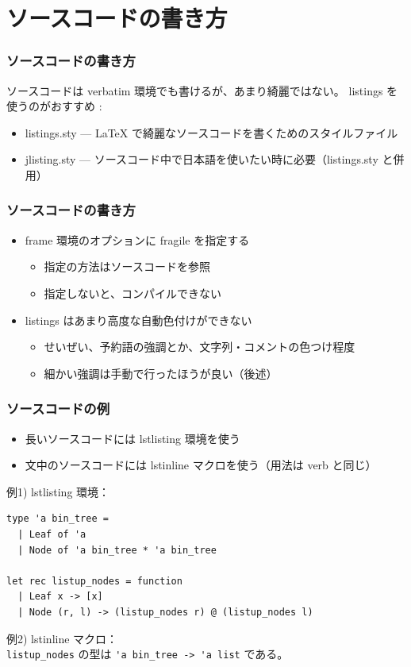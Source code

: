 \documentclass[dvipdfmx,cjk,xcolor=dvipsnames,envcountsect,notheorems,12pt]{beamer}
\theoremstyle{definition}
\begin{document}
\section{ソースコードの書き方}

\begin{frame}
  \frametitle{ソースコードの書き方}
  ソースコードは verbatim 環境でも書けるが、あまり綺麗ではない。
  \vfill
  listings を使うのがおすすめ :
  \begin{itemize}
  \item listings.sty --- LaTeX で綺麗なソースコードを書くためのスタイルファイル
  \item jlisting.sty --- ソースコード中で日本語を使いたい時に必要（listings.sty と併用）
  \end{itemize}
\end{frame}

\begin{frame}
  \renewcommand{\baselinestretch}{1.3}%
  \frametitle{ソースコードの書き方}
  \begin{itemize}
  \item frame 環境のオプションに fragile を指定する
    \begin{itemize}
    \item 指定の方法はソースコードを参照
    \item 指定しないと、コンパイルできない
    \end{itemize}
  \item listings はあまり高度な自動色付けができない
    \begin{itemize}
    \item せいぜい、予約語の強調とか、文字列・コメントの色つけ程度
    \item 細かい強調は手動で行ったほうが良い（後述）
    \end{itemize}
  \end{itemize}
\end{frame}

\begin{frame}[fragile]%
  \frametitle{ソースコードの例}
  \begin{itemize}
  \item 長いソースコードには lstlisting 環境を使う
  \item 文中のソースコードには lstinline マクロを使う（用法は verb と同じ）
  \end{itemize}
  \vfill
  例1) lstlisting 環境：
\begin{lstlisting}
type 'a bin_tree =
  | Leaf of 'a
  | Node of 'a bin_tree * 'a bin_tree

let rec listup_nodes = function
  | Leaf x -> [x]
  | Node (r, l) -> (listup_nodes r) @ (listup_nodes l)
\end{lstlisting}
  \vfill
  例2) lstinline マクロ：\\
  \lstinline|listup_nodes| の型は \lstinline|'a bin_tree -> 'a list| である。
\end{frame}
\end{document}
